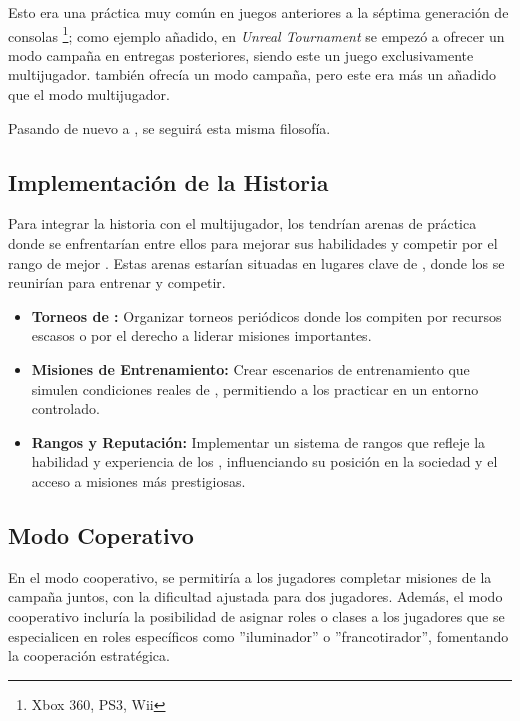     Esto era una práctica muy común en juegos anteriores a la séptima generación de consolas \footnote{Xbox 360, PS3, Wii}; como ejemplo añadido, en \textit{Unreal Tournament} \cite{unrealtournament1999} se empezó a ofrecer un modo campaña en entregas posteriores, siendo este un juego exclusivamente multijugador. \cite{quake1996} también ofrecía un modo campaña, pero este era más un añadido que el modo multijugador.

    Pasando de nuevo a \gameTitle, se seguirá esta misma filosofía.
    \subsection{Implementación de la Historia}
        Para integrar la historia con el multijugador, los \hunters tendrían arenas de práctica donde se enfrentarían entre ellos para mejorar sus habilidades y competir por el rango de mejor \hunter. Estas arenas estarían situadas en lugares clave de \hole, donde los \hunters se reunirían para entrenar y competir.
        \begin{itemize}
            \item \textbf{Torneos de \hunters:} Organizar torneos periódicos donde los \hunters compiten por recursos escasos o por el derecho a liderar misiones importantes.
            \item \textbf{Misiones de Entrenamiento:} Crear escenarios de entrenamiento que simulen condiciones reales de \hole, permitiendo a los \hunters practicar en un entorno controlado.
            \item \textbf{Rangos y Reputación:} Implementar un sistema de rangos que refleje la habilidad y experiencia de los \hunters, influenciando su posición en la sociedad y el acceso a misiones más prestigiosas.
        \end{itemize}
    \subsection{Modo Coperativo}
        En el modo cooperativo, se permitiría a los jugadores completar misiones de la campaña juntos, con la dificultad ajustada para dos jugadores. Además, el modo cooperativo incluría la posibilidad de asignar roles o clases a los jugadores que se especialicen en roles específicos como ''iluminador'' o ''francotirador'', fomentando la cooperación estratégica.
